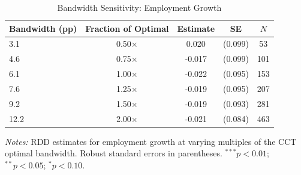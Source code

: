 \begin{table}[htbp]
\centering
\caption{Bandwidth Sensitivity: Employment Growth}
\label{tab:bandwidth}
\begin{tabular}{lcccc}
\toprule
Bandwidth (pp) & Fraction of Optimal & Estimate & SE & $N$ \\
\midrule
3.1 & 0.50$\times$ & 0.020 & (0.099) & 53 \\
4.6 & 0.75$\times$ & -0.017 & (0.099) & 101 \\
6.1 & 1.00$\times$ & -0.022 & (0.095) & 153 \\
7.6 & 1.25$\times$ & -0.019 & (0.095) & 207 \\
9.2 & 1.50$\times$ & -0.019 & (0.093) & 281 \\
12.2 & 2.00$\times$ & -0.021 & (0.084) & 463 \\
\bottomrule
\end{tabular}
\begin{minipage}{0.85\textwidth}
\vspace{0.3em}
\footnotesize \textit{Notes:} RDD estimates for employment growth at varying multiples of the CCT optimal bandwidth.
Robust standard errors in parentheses. $^{***}p<0.01$; $^{**}p<0.05$; $^{*}p<0.10$.
\end{minipage}
\end{table}
